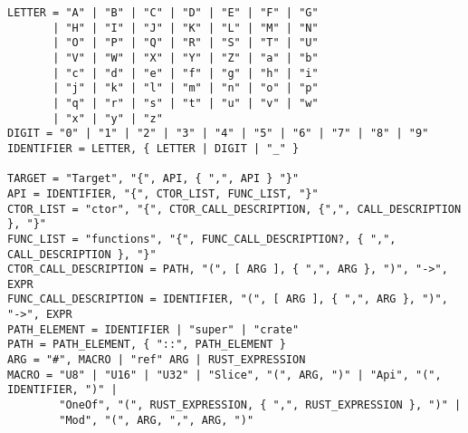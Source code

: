 \begin{minipage}{\linewidth}
\begin{lstlisting}[caption={Target description language grammar.},label={lst:grammar}]
LETTER = "A" | "B" | "C" | "D" | "E" | "F" | "G"
       | "H" | "I" | "J" | "K" | "L" | "M" | "N"
       | "O" | "P" | "Q" | "R" | "S" | "T" | "U"
       | "V" | "W" | "X" | "Y" | "Z" | "a" | "b"
       | "c" | "d" | "e" | "f" | "g" | "h" | "i"
       | "j" | "k" | "l" | "m" | "n" | "o" | "p"
       | "q" | "r" | "s" | "t" | "u" | "v" | "w"
       | "x" | "y" | "z" 
DIGIT = "0" | "1" | "2" | "3" | "4" | "5" | "6" | "7" | "8" | "9"
IDENTIFIER = LETTER, { LETTER | DIGIT | "_" }

TARGET = "Target", "{", API, { ",", API } "}"
API = IDENTIFIER, "{", CTOR_LIST, FUNC_LIST, "}"
CTOR_LIST = "ctor", "{", CTOR_CALL_DESCRIPTION, {",", CALL_DESCRIPTION }, "}"
FUNC_LIST = "functions", "{", FUNC_CALL_DESCRIPTION?, { ",", CALL_DESCRIPTION }, "}"
CTOR_CALL_DESCRIPTION = PATH, "(", [ ARG ], { ",", ARG }, ")", "->", EXPR
FUNC_CALL_DESCRIPTION = IDENTIFIER, "(", [ ARG ], { ",", ARG }, ")", "->", EXPR
PATH_ELEMENT = IDENTIFIER | "super" | "crate"
PATH = PATH_ELEMENT, { "::", PATH_ELEMENT }
ARG = "#", MACRO | "ref" ARG | RUST_EXPRESSION
MACRO = "U8" | "U16" | "U32" | "Slice", "(", ARG, ")" | "Api", "(", IDENTIFIER, ")" |
        "OneOf", "(", RUST_EXPRESSION, { ",", RUST_EXPRESSION }, ")" |
        "Mod", "(", ARG, ",", ARG, ")"
\end{lstlisting}    
\end{minipage}

